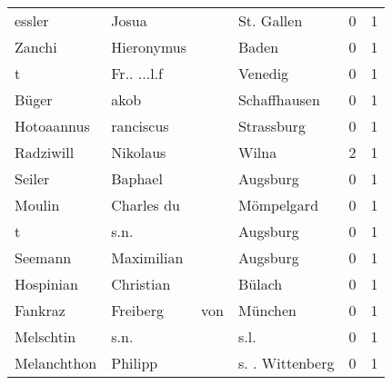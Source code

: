 \begin{tabular}{llllrr}
                   essler &                              Josua &             &                                  St. Gallen &          0 &         1 \\
                   Zanchi &                         Hieronymus &             &                                       Baden &          0 &         1 \\
                        t &                        Fr.. ...l.f &             &                                     Venedig &          0 &         1 \\
                    Büger &                               akob &             &                                Schaffhausen &          0 &         1 \\
               Hotoaannus &                          ranciscus &             &                                  Strassburg &          0 &         1 \\
                Radziwill &                           Nikolaus &             &                                       Wilna &          2 &         1 \\
                   Seiler &                            Baphael &             &                                    Augsburg &          0 &         1 \\
                   Moulin &                         Charles du &             &                                  Mömpelgard &          0 &         1 \\
                        t &                               s.n. &             &                                    Augsburg &          0 &         1 \\
                  Seemann &                         Maximilian &             &                                    Augsburg &          0 &         1 \\
                Hospinian &                          Christian &             &                                      Bülach &          0 &         1 \\
                  Fankraz &                           Freiberg &         von &                                     München &          0 &         1 \\
                Melschtin &                               s.n. &             &                                        s.l. &          0 &         1 \\
              Melanchthon &                            Philipp &             &                             s. . Wittenberg &          0 &         1 \\

\end{tabular}
